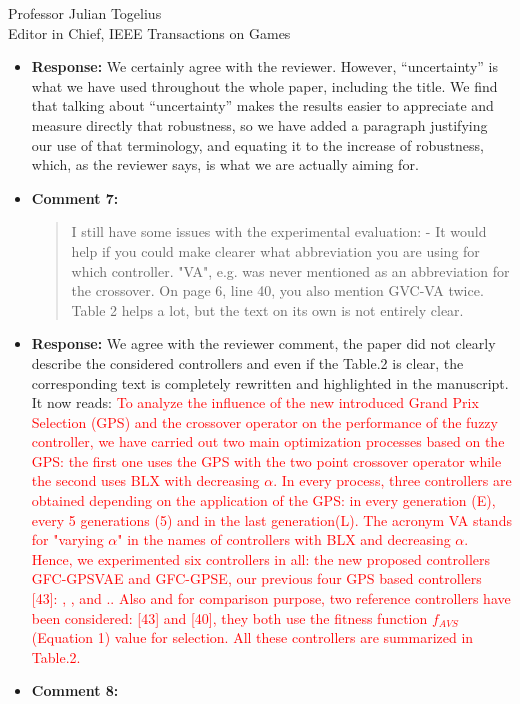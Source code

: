 \documentclass[10pt]{letter} %
\begin{document}
\begin{letter}{Professor Julian Togelius \\ Editor in Chief, IEEE Transactions on Games}
\begin{enumerate}
\begin{itemize}
\begin{quote}
				\end{quote}
			\item {\bf Response:}
We certainly agree with the reviewer. However, ``uncertainty'' is what
we have used throughout the whole paper, including the title. We find
that talking about ``uncertainty'' makes the results easier to appreciate and measure directly that
robustness, so we have added a paragraph justifying our use of that
terminology, and equating it to the increase of robustness, which, as
the reviewer says, is what we are actually aiming for.
			\item {\bf Comment 7:}
				\begin{quote}	
					I still have some issues with the experimental evaluation:
					- It would help if you could make clearer what abbreviation you are using for which controller. "VA", e.g. was never mentioned as an abbreviation for the crossover. On page 6, line 40, you also mention GVC-VA twice. Table 2 helps a lot, but the text on its own is not entirely clear.
				\end{quote}	
			\item {\bf Response:} 
			We agree with the reviewer comment, the paper did not clearly describe  the considered controllers and even if the Table.2 is clear, the corresponding text is completely rewritten and highlighted in the manuscript. It now reads:
			\textcolor{red}{
				To analyze the influence of the new introduced Grand Prix Selection (GPS) and the crossover operator on the performance of the fuzzy controller, we have carried out two main optimization processes based on the GPS: the first one uses the GPS with the two point crossover operator while the second uses  BLX with decreasing $\alpha$.
				In every process, three controllers are obtained depending on the application of the GPS: in every generation (E), every 5 generations (5) and in the last generation(L). The acronym VA  stands for "varying $\alpha$" in the names of  controllers with BLX and decreasing $\alpha$.
				Hence, we experimented six controllers in all: the new
				proposed controllers {\sf GFC-GPSVAE} and {\sf GFC-GPSE}, our previous four GPS based controllers  [43]: {}, {},{} and {}..
				Also and for comparison purpose, two reference controllers have been considered: {}[43] and {}[40], they both use the fitness function $f_{AVS}$ (Equation 1) value for selection.
				All these controllers are summarized in Table.2. 
			}
			\item {\bf Comment 8:}

\end{itemize}
\end{enumerate}
\end{letter}
\end{document}
